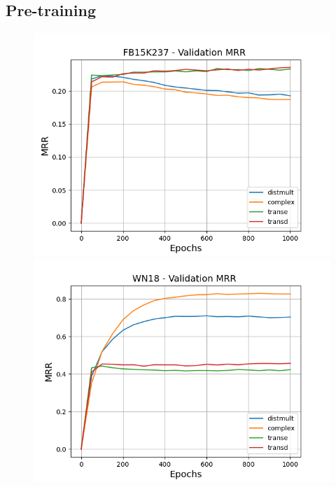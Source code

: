 \subsection{Pre-training}
\label{app:subsec:pretraining}

\begin{figure}
    \centering
    \begin{minipage}{.3\textwidth}
      \centering
      \includegraphics[width=\linewidth]{figures/results/pretrain/fb15k237/pretrain_fb15k237_mrrs.png}
    \end{minipage}%
    \begin{minipage}{.3\textwidth}
      \centering
      \includegraphics[width=\linewidth]{figures/results/pretrain/wn18/pretrain_wn18_mrrs.png}

\end{minipage}
\end{figure}
